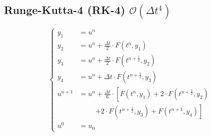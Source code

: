 \subsection{Runge-Kutta-4 (RK-4) \texorpdfstring{\hfill $\mathcal{O}(\Delta t^4)$}{O(t4)}}
    \vspace{-1em}
    $$
        \begin{cases}
            y_1 &= u^n\\
            y_2 &= u^n +  \frac{\Delta t}{2} \cdot F(t^n, y_1)\\
            y_3 &= u^n +  \frac{\Delta t}{2} \cdot F\left(t^{n+\frac{1}{2}}, y_2 \right)\\
            y_4 &= u^n +  \Delta t \cdot F\left(t^{n+\frac{1}{2}}, y_3 \right)\\
            u^{n+1} &= u^n +  \frac{\Delta t}{6} \cdot \left[ F(t^n, y_1) + 2 \cdot F\left(t^{n+\frac{1}{2}}, y_2 \right) \right.\\ 
                    &\phantom{= u^n} \left. + 2 \cdot F\left(t^{n+\frac{1}{2}}, y_3 \right) + F\left(t^{n+1}, y_4 \right) \right]\\
            u^0 &= u_0
        \end{cases}
    $$
    \vspace{-0.5em}